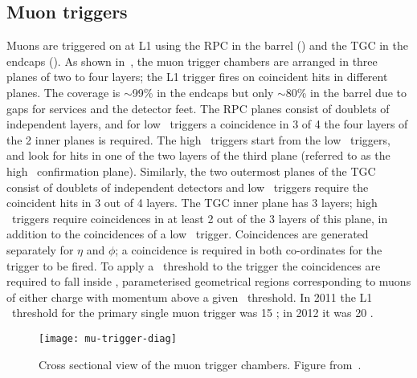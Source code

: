 \subsection{Muon triggers}
\label{sec:reco-mu-triggers}

Muons are triggered on at L1 using the RPC in the barrel () and
the TGC in the endcaps (). As shown in~, the
muon trigger chambers are arranged in three planes of two to four layers; the L1
trigger fires on coincident hits in different planes. The coverage is $\sim$99\% in the
endcaps but only $\sim$80\% in the barrel due to gaps for services and the
detector feet.  The RPC planes consist of doublets of independent layers, and
for low \pt\ triggers a coincidence in 3 of 4 the four layers of the 2 inner planes
is required. The high \pt\ triggers start from the low \pt\ triggers, and look
for hits in one of the two layers of the third plane (referred to as the high
\pt\ confirmation plane). Similarly, the two outermost planes of the TGC consist
of doublets of independent detectors and low \pt\ triggers require the
coincident hits in 3 out of 4 layers. The TGC inner plane has 3
layers; high \pt\ triggers require coincidences in at least 2 out of the 3 layers
of this plane, in addition to the coincidences of a low \pt\ trigger. Coincidences are generated
separately for $\eta$ and $\phi$; a coincidence is required in both co-ordinates
for the trigger to be fired. To apply a \pt\ threshold to the trigger the
coincidences are required to fall inside , parameterised
geometrical regions corresponding to muons of either charge with momentum above
a given \pt\ threshold. In 2011 the L1 \pt\ threshold for the primary single
muon trigger was 15 \GeV; in 2012 it was 20 \GeV.

\begin{figure}[h]
\centering
            \texttt{[image: mu-trigger-diag]}
\caption{
Cross sectional view of the muon trigger chambers. Figure from~\cite{Aad:2012xs}.}
\label{fig:mu-trigger-diag}
\end{figure}

